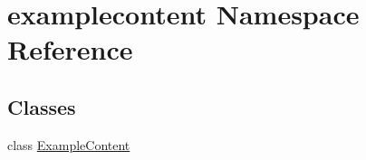 \hypertarget{namespaceexamplecontent}{}\section{examplecontent Namespace Reference}
\label{namespaceexamplecontent}
\subsection*{Classes}
\begin{DoxyCompactItemize}
\item 
class \hyperlink{classexamplecontent_1_1ExampleContent}{Example\+Content}
\end{DoxyCompactItemize}
